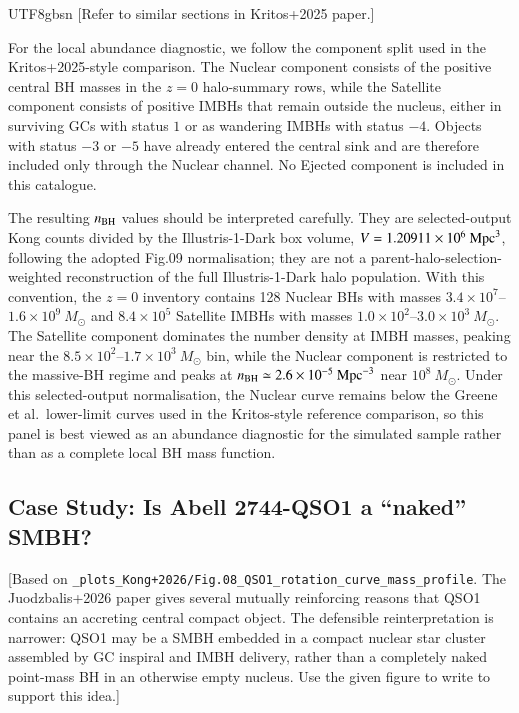 \documentclass[trackchanges, twocolappendix, twocolumn]{aastex701}
\newcommand{\czkong}[1]{{\color{magenta}#1}}
\begin{document}
\begin{CJK*}{UTF8}{gbsn}
\czkong{[Refer to similar sections in Kritos+2025 paper.]}

For the local abundance diagnostic, we follow the component split used in the Kritos+2025-style comparison. The Nuclear component consists of the positive central BH masses in the $z=0$ halo-summary rows, while the Satellite component consists of positive IMBHs that remain outside the nucleus, either in surviving GCs with status $1$ or as wandering IMBHs with status $-4$. Objects with status $-3$ or $-5$ have already entered the central sink and are therefore included only through the Nuclear channel. No Ejected component is included in this catalogue.

The resulting $n_{\rm BH}$ values should be interpreted carefully. They are selected-output Kong counts divided by the Illustris-1-Dark box volume, $V=1.20911\times10^6~{\rm Mpc}^{3}$, following the adopted Fig.09 normalisation; they are not a parent-halo-selection-weighted reconstruction of the full Illustris-1-Dark halo population. With this convention, the $z=0$ inventory contains 128 Nuclear BHs with masses $3.4\times10^7$--$1.6\times10^9~M_\odot$ and $8.4\times10^5$ Satellite IMBHs with masses $1.0\times10^2$--$3.0\times10^3~M_\odot$. The Satellite component dominates the number density at IMBH masses, peaking near the $8.5\times10^2$--$1.7\times10^3~M_\odot$ bin, while the Nuclear component is restricted to the massive-BH regime and peaks at $n_{\rm BH}\simeq2.6\times10^{-5}~{\rm Mpc}^{-3}$ near $10^8~M_\odot$. Under this selected-output normalisation, the Nuclear curve remains below the Greene et al.\ lower-limit curves used in the Kritos-style reference comparison, so this panel is best viewed as an abundance diagnostic for the simulated sample rather than as a complete local BH mass function.

\subsection{Case Study: Is Abell 2744-QSO1 a ``naked'' SMBH?} \label{subsect:case}

\czkong{[Based on \texttt{\_plots\_Kong+2026/Fig.08\_QSO1\_rotation\_curve\_mass\_profile}. The Juodzbalis+2026 paper gives several mutually reinforcing reasons that QSO1 contains an accreting central compact object. The defensible reinterpretation is narrower: QSO1 may be a SMBH embedded in a compact nuclear star cluster assembled by GC inspiral and IMBH delivery, rather than a completely naked point-mass BH in an otherwise empty nucleus. Use the given figure to write to support this idea.]}


\end{CJK*}
\end{document}
